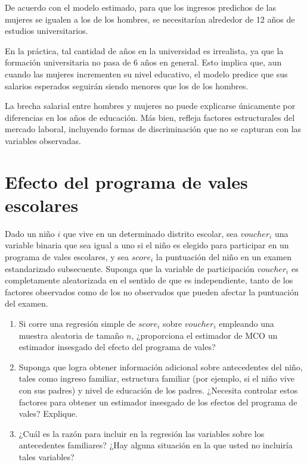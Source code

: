 \documentclass[12pt]{article}
\begin{document}
De acuerdo con el modelo estimado, para que los ingresos predichos de las mujeres se igualen a los de los hombres, se necesitarían alrededor de 12 años de estudios universitarios. 

En la práctica, tal cantidad de años en la universidad es irrealista, ya que la formación universitaria no pasa de 6 años en general. Esto implica que, aun cuando las mujeres incrementen su nivel educativo, el modelo predice que sus salarios esperados seguirán siendo menores que los de los hombres.

La brecha salarial entre hombres y mujeres no puede explicarse únicamente por diferencias en los años de educación. Más bien, refleja factores estructurales del mercado laboral, incluyendo formas de discriminación que no se capturan con las variables observadas.

\section{Efecto del programa de vales escolares}

Dado un niño $i$ que vive en un determinado distrito escolar, sea $voucher_i$ una variable binaria que sea igual a uno si el niño es elegido para participar en un programa de vales escolares, y sea $score_i$ la puntuación del niño en un examen estandarizado subsecuente. Suponga que la variable de participación $voucher_i$ es completamente aleatorizada en el sentido de que es independiente, tanto de los factores observados como de los no observados que pueden afectar la puntuación del examen.

\begin{enumerate}[label=\alph*)]
    \item Si corre una regresión simple de $score_i$ sobre $voucher_i$ empleando una muestra aleatoria de tamaño $n$, ¿proporciona el estimador de MCO un estimador insesgado del efecto del programa de vales?

    \item Suponga que logra obtener información adicional sobre antecedentes del niño, tales como ingreso familiar, estructura familiar (por ejemplo, si el niño vive con sus padres) y nivel de educación de los padres. ¿Necesita controlar estos factores para obtener un estimador insesgado de los efectos del programa de vales? Explique.

    \item ¿Cuál es la razón para incluir en la regresión las variables sobre los antecedentes familiares? ¿Hay alguna situación en la que usted no incluiría tales variables?
\end{enumerate}
\end{document}

